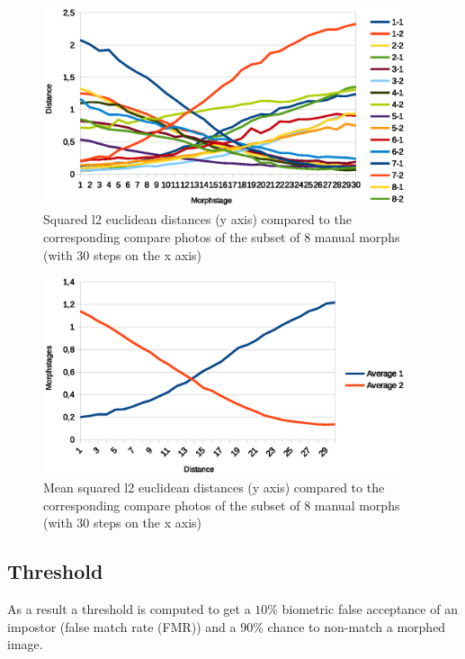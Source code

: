 \begin{figure}[htbp] 
	\centering
		\includegraphics[width=0.95\textwidth]{Resources/result-jannisODF.eps}
	\caption{Squared l2 euclidean distances (y axis) compared
	to the corresponding compare photos of the subset of 8 manual morphs (with 30 steps on the x axis)}
	\label{fig:result-jannis-all}
\end{figure}
\begin{figure}[htbp] 
	\centering
		\includegraphics[width=0.95\textwidth]{Resources/result-jannis-meanODF.eps}
	\caption{Mean squared l2 euclidean distances (y axis) compared to the corresponding compare photos of the subset of 8 manual morphs (with 30 steps on the x axis)}
	\label{fig:result-jannis-mean}
\end{figure}

\subsection{Threshold}
\label{Threshold}
As a result a threshold is computed to get a $10$\% biometric false acceptance of an impostor (false match rate (FMR)) and a $90$\% chance to non-match a morphed image.

